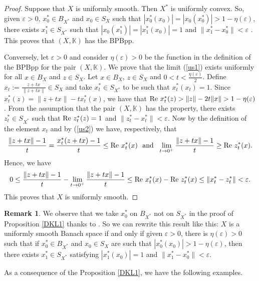 \documentclass[12pt,a4paper]{amsart}
\theoremstyle{definition}
\newtheorem{remark}[theorem]{Remark}
\newcommand{\e}{\varepsilon}
\DeclareMathOperator{\re}{Re}
\numberwithin{equation}{section}
\newcommand{\K}{\mathbb{K}} %
\def\K{{\mathbb K}}
\def\re{\hbox{\rm Re~}}
\begin{document}
\begin{proof} Suppose that $X$ is uniformly smooth. Then $X^*$ is uniformly convex. So, given $\e >0$, $x_0^* \in B_{X^*}$ and $x_0 \in S_X$ such that $|x_0^*(x_0)| = |x_0 (x_0^*)| > 1 - \eta(\e)$, there exists $x_1^* \in S_{X^*}$ such that $|x_0(x_1^*)| = |x_1^*(x_0)| = 1$ and $\|x_1^* - x_0^*\| < \e$ \cite[Theorem 2.1]{KL}. This proves that $(X, \K)$ has the BPBpp.

 Conversely, let $\e > 0$ and consider $\eta(\e) > 0$ be the function in the definition of the BPBpp for the pair $(X, \K)$. We prove that the limit (\ref{us1}) exists uniformly for all $x \in B_X$ and $z \in S_X$. Let $x \in B_X$, $z \in S_X$ and $0 < t < \frac{\eta(\e)}{2}$. Define $x_t := \frac{z + tx}{\|z + tx\|} \in S_X$ and take $x_t^* \in S_{X^*}$ to be such that $x_t^*(x_t) = 1$. Since $x_t^*(z) = \|z + tx\| - tx_t^*(x)$, we have that $\re x_t^*(z) > \|z\| - 2t \|x\| > 1 - \eta(\e)$. From the assumption that the pair $(X, \K)$ has the property, there exists $z_t^* \in S_{X^*}$ such that $\re z_t^*(z) = 1$ and $\|z_t^* - x_t^*\| < \e$. Now by the definition of the element $x_t$ and by (\ref{us2}) we have, respectively, that
\begin{equation*}
\frac{\|z + tx\| - 1}{t} = \frac{x_t^*(z + tx) - 1}{t} \leq \re x_t^*(x) \ \ \mbox{and} \ \ \lim_{t \rightarrow 0^+} \frac{\|z + tx\| - 1}{t} \geq \re z_t^*(x).
\end{equation*}
Hence, we have
\begin{equation*}
0 \leq \frac{\|z + tx\| - 1}{t} - \lim_{t \rightarrow 0^+} \frac{\|z + tx\| - 1}{t} \leq \re x_t^*(x) - \re z_t^*(x) \leq \|x_t^* - z_t^*\| < \e.
\end{equation*}
This proves that $X$ is uniformly smooth.
\end{proof}

\begin{remark} We observe that we take $x_0^*$ on $B_{X^*}$ not on $S_{X^*}$ in the proof of Proposition \ref{DKL1} thanks to \cite[Theorem 2.1]{KL}. So we can rewrite this result like this: $X$ is a uniformly smooth Banach space if and only if given $\e > 0$, there is $\eta(\e) > 0$ such that if $x_0^* \in B_{X^*}$ and $x_0 \in S_X$ are such that $|x_0^*(x_0)| > 1 - \eta(\e)$, then there exists $x_1^* \in S_{X^*}$ satisfying $|x_1^*(x_0)| = 1$ and $\|x_1^* - x_0^*\| < \e$.
\end{remark}

As a consequence of the Proposition \ref{DKL1}, we have the following examples.
\end{document}
